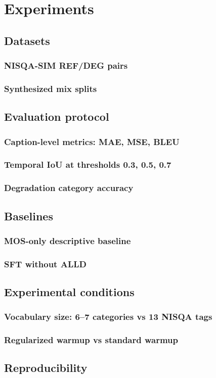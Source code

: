 \chapter{Experiments} \label{ch:experiments}

\section{Datasets} \label{sec:exp-datasets}
\subsection{NISQA-SIM REF/DEG pairs}
\subsection{Synthesized mix splits}

\section{Evaluation protocol} \label{sec:exp-eval}
\subsection{Caption-level metrics: MAE, MSE, BLEU}
\subsection{Temporal IoU at thresholds 0.3, 0.5, 0.7}
\subsection{Degradation category accuracy}

\section{Baselines} \label{sec:exp-baselines}
\subsection{MOS-only descriptive baseline}
\subsection{SFT without ALLD}

\section{Experimental conditions} \label{sec:exp-conditions}
\subsection{Vocabulary size: 6--7 categories vs 13 NISQA tags}
\subsection{Regularized warmup vs standard warmup}

\section{Reproducibility} \label{sec:exp-reproducibility}
